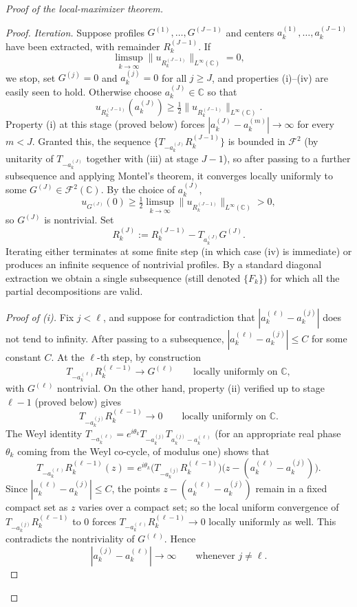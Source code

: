 \documentclass[a4paper,11pt,reqno]{amsart}
\numberwithin{equation}{section}
\theoremstyle{plain} %
\theoremstyle{definition} %
\theoremstyle{remark}
\newcommand{\C}{\mathbb{C}}
\begin{document}
\begin{proof}[Proof of the local-maximizer theorem]
\begin{proof}
\medskip
\noindent\emph{Iteration.}
Suppose profiles \(G^{(1)},\dots,G^{(J-1)}\) and centers
\(a_k^{(1)},\dots,a_k^{(J-1)}\) have been extracted, with remainder
\(R_k^{(J-1)}\). If
\[
\limsup_{k\to\infty}\|u_{R_k^{(J-1)}}\|_{L^\infty(\C)}=0,
\]
we stop, set \(G^{(j)}=0\) and \(a_k^{(j)}=0\) for all \(j\ge J\), and
properties (i)--(iv) are easily seen to hold. Otherwise choose
\(a_k^{(J)}\in\C\) so that
\[
u_{R_k^{(J-1)}}(a_k^{(J)})
\ge \tfrac12\|u_{R_k^{(J-1)}}\|_{L^\infty(\C)}.
\]
Property (i) at this stage (proved below) forces
\(|a_k^{(J)}-a_k^{(m)}|\to\infty\) for every \(m<J\). Granted this, the
sequence \(\{T_{-a_k^{(J)}}R_k^{(J-1)}\}\) is bounded in \(\mathcal F^2\) (by
unitarity of \(T_{-a_k^{(J)}}\) together with (iii) at stage \(J-1\)), so
after passing to a further subsequence and applying Montel's theorem, it
converges locally uniformly to some \(G^{(J)}\in\mathcal F^2(\C)\). By the
choice of \(a_k^{(J)}\),
\[
u_{G^{(J)}}(0)
\ge \tfrac12 \limsup_{k\to\infty}\|u_{R_k^{(J-1)}}\|_{L^\infty(\C)}>0,
\]
so \(G^{(J)}\) is nontrivial. Set
\[
R_k^{(J)}:=R_k^{(J-1)}-T_{a_k^{(J)}}G^{(J)}.
\]
Iterating either terminates at some finite step (in which case (iv) is
immediate) or produces an infinite sequence of nontrivial profiles. By a
standard diagonal extraction we obtain a single subsequence (still denoted
\(\{F_k\}\)) for which all the partial decompositions are valid.

\medskip
\noindent\emph{Proof of (i).}
Fix \(j<\ell\), and suppose for contradiction that
\(|a_k^{(\ell)}-a_k^{(j)}|\) does not tend to infinity. After passing to a
subsequence, \(|a_k^{(\ell)}-a_k^{(j)}|\le C\) for some constant \(C\). At
the \(\ell\)-th step, by construction
\[
T_{-a_k^{(\ell)}}R_k^{(\ell-1)}\to G^{(\ell)}
\qquad\text{locally uniformly on }\C,
\]
with \(G^{(\ell)}\) nontrivial. On the other hand, property (ii) verified up
to stage \(\ell-1\) (proved below) gives
\[
T_{-a_k^{(j)}}R_k^{(\ell-1)}\to 0
\qquad\text{locally uniformly on }\C.
\]
The Weyl identity
\(T_{-a_k^{(\ell)}}=e^{i\theta_k}T_{-a_k^{(j)}}T_{a_k^{(j)}-a_k^{(\ell)}}\)
(for an appropriate real phase \(\theta_k\) coming from the Weyl co-cycle, of
modulus one) shows that
\[
T_{-a_k^{(\ell)}}R_k^{(\ell-1)}(z)
=
e^{i\theta_k}\big(T_{-a_k^{(j)}}R_k^{(\ell-1)}\big)\!
\big(z-(a_k^{(\ell)}-a_k^{(j)})\big).
\]
Since \(|a_k^{(\ell)}-a_k^{(j)}|\le C\), the points
\(z-(a_k^{(\ell)}-a_k^{(j)})\) remain in a fixed compact set as \(z\)
varies over a compact set; so the local uniform convergence of
\(T_{-a_k^{(j)}}R_k^{(\ell-1)}\) to \(0\) forces
\(T_{-a_k^{(\ell)}}R_k^{(\ell-1)}\to 0\) locally uniformly as well.
This contradicts the nontriviality of \(G^{(\ell)}\). Hence
\[
|a_k^{(j)}-a_k^{(\ell)}|\to\infty
\qquad\text{whenever }j\neq \ell.
\]


\end{proof}
\end{proof}
\end{document}
